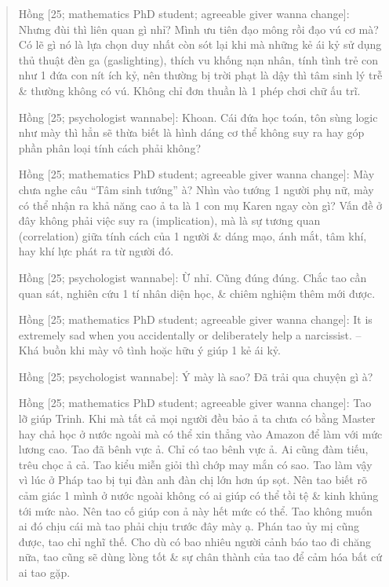 \documentclass[12pt]{article}
\begin{document}
\begin{quote}
	{\sf Hồng [25; mathematics PhD student; agreeable giver wanna change]}: Nhưng đùi thì liên quan gì nhỉ? Mình ưu tiên đạo mông rồi đạo vú cơ mà? Có lẽ gì nó là lựa chọn duy nhất còn sót lại khi mà những kẻ ái kỷ sử dụng thủ thuật đèn ga (gaslighting), thích vu khống nạn nhân, tính tình trẻ con như 1 đứa con nít ích kỷ, nên thường bị trời phạt là dậy thì tâm sinh lý trễ \& thường không có vú. Không chỉ đơn thuần là 1 phép chơi chữ ấu trĩ.
	
	{\sf Hồng [25; psychologist wannabe]}: Khoan. Cái đứa học toán, tôn sùng logic như mày thì hẳn sẽ thừa biết là hình dáng cơ thể không suy ra hay góp phần phân loại tính cách phải không?
	
	{\sf Hồng [25; mathematics PhD student; agreeable giver wanna change]}: Mày chưa nghe câu ``Tâm sinh tướng'' à? Nhìn vào tướng 1 người phụ nữ, mày có thể nhận ra khả năng cao ả ta là 1 con mụ Karen ngay còn gì? Vấn đề ở đây không phải việc suy ra (implication), mà là sự tương quan (correlation) giữa tính cách của 1 người \& dáng mạo, ánh mắt, tâm khí, hay khí lực phát ra từ người đó.
	
	{\sf Hồng [25; psychologist wannabe]}: Ừ nhỉ. Cũng đúng đúng. Chắc tao cần quan sát, nghiên cứu 1 tí nhân diện học, \& chiêm nghiệm thêm mới được.
	
	{\sf Hồng [25; mathematics PhD student; agreeable giver wanna change]}: It is extremely sad when you accidentally or deliberately help a narcissist. -- Khá buồn khi mày vô tình hoặc hữu ý giúp 1 kẻ ái kỷ.
	
	{\sf Hồng [25; psychologist wannabe]}: Ý mày là sao? Đã trải qua chuyện gì à?
	
	{\sf Hồng [25; mathematics PhD student; agreeable giver wanna change]}: Tao lỡ giúp Trinh. Khi mà tất cả mọi người đều bảo ả ta chưa có bằng Master hay chả học ở nước ngoài mà có thể xin thẳng vào Amazon để làm với mức lương cao. Tao đã bênh vực ả. Chỉ có tao bênh vực ả. Ai cũng đàm tiếu, trêu chọc ả cả. Tao kiểu miễn giỏi thì chớp may mắn có sao. Tao làm vậy vì lúc ở Pháp tao bị tụi đàn anh đàn chị lớn hơn úp sọt. Nên tao biết rõ cảm giác 1 mình ở nước ngoài không có ai giúp có thể tồi tệ \& kinh khủng tới mức nào. Nên tao cố giúp con ả này hết mức có  thể. Tao không muốn ai đó chịu cái mà tao phải chịu trước đây mày ạ. Phán tao ủy mị cũng được, tao chỉ nghĩ thế. Cho dù có bao nhiêu người cảnh báo tao đi chăng nữa, tao cũng sẽ dùng lòng tốt \& sự chân thành của tao để cảm hóa bất cứ ai tao gặp.
	

\end{quote}
\end{document}
